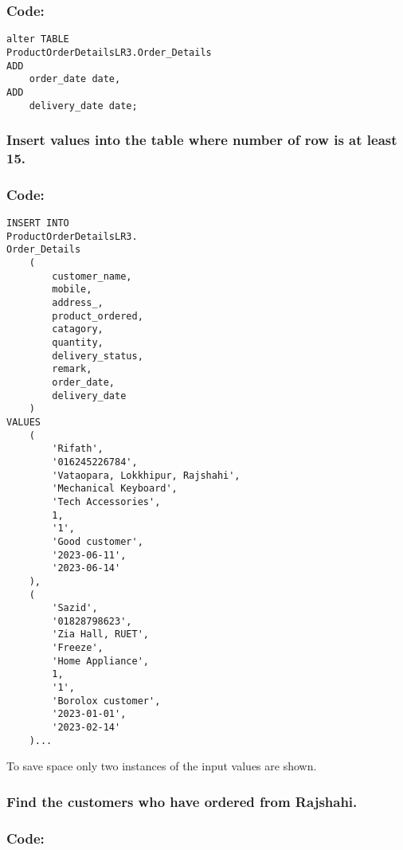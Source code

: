 \documentclass[12pt]{article}
\begin{document}
\subsubsection*{Code: }
\begin{verbatim}
alter TABLE
ProductOrderDetailsLR3.Order_Details
ADD
    order_date date,
ADD
    delivery_date date;
\end{verbatim}

\vspace{13mm}

\subsubsection{Insert values into the table where number of row  is at least 15.}
\subsubsection*{Code: }
\begin{multicols*}{2}
    \begin{verbatim}
INSERT INTO 
ProductOrderDetailsLR3.
Order_Details
    (
        customer_name,
        mobile,
        address_,
        product_ordered,
        catagory,
        quantity,
        delivery_status,
        remark,
        order_date,
        delivery_date
    )
VALUES
    (
        'Rifath',
        '016245226784',
        'Vataopara, Lokkhipur, Rajshahi',
        'Mechanical Keyboard',
        'Tech Accessories',
        1,
        '1',
        'Good customer',
        '2023-06-11',
        '2023-06-14'
    ),
    (
        'Sazid',
        '01828798623',
        'Zia Hall, RUET',
        'Freeze',
        'Home Appliance', 
        1,
        '1',
        'Borolox customer',
        '2023-01-01',
        '2023-02-14'
    )...
\end{verbatim}
    To save space only two instances of the input values are shown.
\end{multicols*}


\vspace{13mm}

\subsubsection{Find the customers who have ordered from Rajshahi.}
\subsubsection*{Code:}
\end{document}

